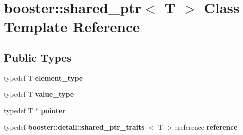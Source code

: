 \section{booster\-:\-:shared\-\_\-ptr$<$ \-T $>$ \-Class \-Template \-Reference}
\label{classbooster_1_1shared__ptr}
\subsection*{\-Public \-Types}
\begin{DoxyCompactItemize}
\item 
typedef \-T {\bfseries element\-\_\-type}\label{classbooster_1_1shared__ptr_a39185bbbcb2b45c05078b172aba40d18}

\item 
typedef \-T {\bfseries value\-\_\-type}\label{classbooster_1_1shared__ptr_a4e47f9bb1d99914dae9c423decd5b212}

\item 
typedef \-T $\ast$ {\bfseries pointer}\label{classbooster_1_1shared__ptr_aacdf919530faee7137bd7316c09b7858}

\item 
typedef \*
{\bf booster\-::detail\-::shared\-\_\-ptr\-\_\-traits}\*
$<$ \-T $>$\-::reference {\bfseries reference}\label{classbooster_1_1shared__ptr_af6612466646e048e063db10122e48099}

\end{DoxyCompactItemize}
